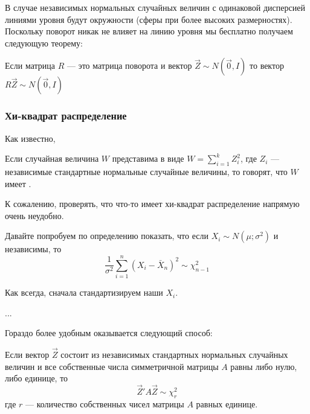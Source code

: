 В случае независимых нормальных случайных величин с одинаковой дисперсией линиями уровня будут окружности (сферы при более высоких размерностях). Поскольку поворот никак не влияет на линию уровня мы бесплатно получаем следующую теорему:

\begin{myth} \label{th:rotate_normal}
Если матрица $R$ --- это матрица поворота и вектор $\vec{Z}\sim N(\vec{0},I)$ то вектор $R\vec{Z}\sim N(\vec{0},I)$
\end{myth}



\subsubsection*{Хи-квадрат распределение}

Как известно,

\begin{mydef} Если случайная величина $W$ представима в виде $W=\sum_{i=1}^{k}Z_{i}^{2}$, где $Z_{i}$ --- независимые стандартные нормальные случайные величины, то говорят, что $W$ имеет .
\end{mydef}


К сожалению, проверять, что что-то имеет хи-квадрат распределение напрямую очень неудобно.

\begin{myex}
Давайте попробуем по определению показать, что если $X_{i}\sim N(\mu;\sigma^{2})$ и независимы, то 
\begin{equation}
\frac{1}{\sigma^{2}}\sum_{i=1}^{n}(X_{i}-\bar{X}_{n})^{2}\sim \chi_{n-1}^{2}
\end{equation}

Как всегда, сначала стандартизируем наши $X_{i}$. 



...


\end{myex}


Гораздо более удобным оказывается следующий способ:
\begin{myth}
Если вектор $\vec{Z}$ состоит из независимых стандартных нормальных случайных величин и все собственные числа симметричной матрицы $A$ равны либо нулю, либо единице, то 
\begin{equation}
\vec{Z}'A\vec{Z}\sim \chi_{r}^{2}
\end{equation}
где $r$ --- количество собственных чисел матрицы $A$ равных единице.
\end{myth}

